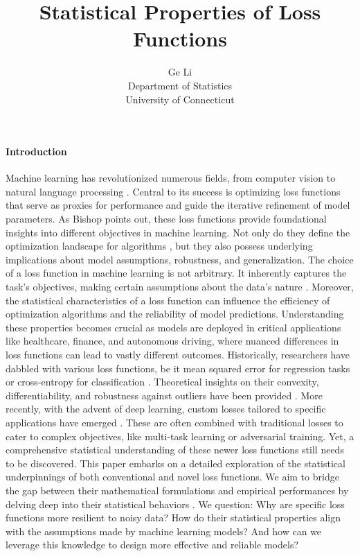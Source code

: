\documentclass[12pt]{article}
\title{Statistical Properties of Loss Functions}
\author{Ge Li\\
  Department of Statistics\\
  University of Connecticut
}
\begin{document}
\maketitle


\paragraph{Introduction}
Machine learning has revolutionized numerous fields, from computer vision to natural language processing \cite{goodfellow2016deep}. Central to its success is optimizing loss functions that serve as proxies for performance and guide the iterative refinement of model parameters. As Bishop \cite{bishop2006pattern} points out, these loss functions provide foundational insights into different objectives in machine learning. Not only do they define the optimization landscape for algorithms \cite{boyd2004convex}, but they also possess underlying implications about model assumptions, robustness, and generalization. The choice of a loss function in machine learning is not arbitrary. It inherently captures the task's objectives, making certain assumptions about the data's nature \cite{zhang2004statistical}. Moreover, the statistical characteristics of a loss function can influence the efficiency of optimization algorithms and the reliability of model predictions. Understanding these properties becomes crucial as models are deployed in critical applications like healthcare, finance, and autonomous driving, where nuanced differences in loss functions can lead to vastly different outcomes. Historically, researchers have dabbled with various loss functions, be it mean squared error for regression tasks or cross-entropy for classification \cite{bishop2006pattern}. Theoretical insights on their convexity, differentiability, and robustness against outliers have been provided \cite{huber1964robust}. More recently, with the advent of deep learning, custom losses tailored to specific applications have emerged \cite{goodfellow2016deep}. These are often combined with traditional losses to cater to complex objectives, like multi-task learning or adversarial training. Yet, a comprehensive statistical understanding of these newer loss functions still needs to be discovered. This paper embarks on a detailed exploration of the statistical underpinnings of both conventional and novel loss functions. We aim to bridge the gap between their mathematical formulations and empirical performances by delving deep into their statistical behaviors \cite{sokolovska2010asymptotics}. We question: Why are specific loss functions more resilient to noisy data? How do their statistical properties align with the assumptions made by machine learning models? And how can we leverage this knowledge to design more effective and reliable models?
\end{document}
